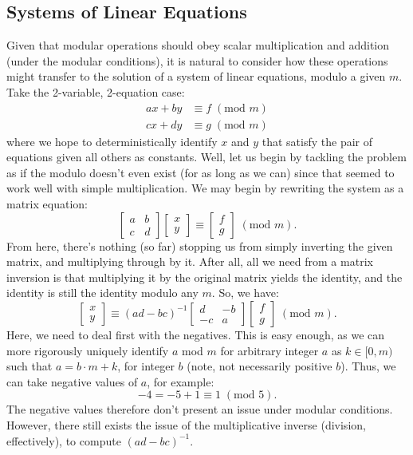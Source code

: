\documentclass{article}
\begin{document}
\subsection{Systems of Linear Equations}
Given that modular operations should obey scalar multiplication and addition (under the modular conditions), it is natural to consider how these operations might transfer to the solution of a system of linear equations, modulo a given $m$. Take the 2-variable, 2-equation case:
\begin{align*}
    ax + by &\equiv f \; (\text{mod } m) \\
    cx + dy &\equiv g \; (\text{mod } m)
\end{align*}
where we hope to deterministically identify $x$ and $y$ that satisfy the pair of equations given all others as constants. Well, let us begin by tackling the problem as if the modulo doesn't even exist (for as long as we can) since that seemed to work well with simple multiplication. We may begin by rewriting the system as a matrix equation:
\[
    \begin{bmatrix}
        a & b \\
        c & d
    \end{bmatrix} \begin{bmatrix}
        x \\
        y
    \end{bmatrix} \equiv \begin{bmatrix}
        f \\
        g
    \end{bmatrix} \; (\text{mod } m).
\]
From here, there's nothing (so far) stopping us from simply inverting the given matrix, and multiplying through by it. After all, all we need from a matrix inversion is that multiplying it by the original matrix yields the identity, and the identity is still the identity modulo any $m$. So, we have:
\[
    \begin{bmatrix}
        x \\
        y
    \end{bmatrix} \equiv (ad - bc)^{-1} \begin{bmatrix}
        d & -b \\
        -c & a
    \end{bmatrix} \begin{bmatrix}
        f \\
        g
    \end{bmatrix} \; (\text{mod } m).
\]
Here, we need to deal first with the negatives. This is easy enough, as we can more rigorously uniquely identify $a$ mod $m$ for arbitrary integer $a$ as $k \in [0, m)$ such that $a = b \cdot m + k$, for integer $b$ (note, not necessarily positive $b$). Thus, we can take negative values of $a$, for example:
\[
    -4 = -5 + 1 \equiv 1 \; (\text{mod } 5).
\]
The negative values therefore don't present an issue under modular conditions. However, there still exists the issue of the multiplicative inverse (division, effectively), to compute $(ad - bc)^{-1}$.
\end{document}
